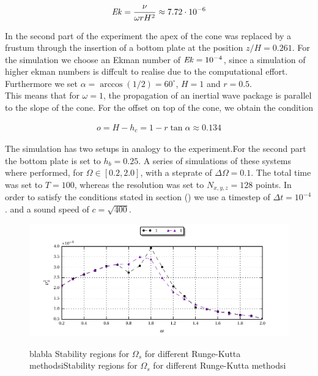 \begin{align}
    \mbox{\textit{Ek}} = \frac{\nu}{\omega r H^2} \approx 7.72\cdot 10^{-6}
\end{align}

In the second part of the experiment the apex of the cone was replaced by a frustum through the
insertion of a bottom plate at the position $z/H = 0.261$.
For the simulation we choose an Ekman number of $\mbox{\textit{Ek}} =  10^{-4}$, since a simulation of higher ekman numbers is
diffcult to realise due to the computational effort.
Furthermore we set $\alpha = \arccos(1/2) = 60^{\circ}$, $H=1$ and $r=0.5$.\\
This means that for $\omega=1$, the propagation of an inertial wave package is parallel to the slope of the cone.
For the offset on top of the cone, we obtain the condition

\begin{align}
    o = H - h_c =  1 - r\tan{\alpha} \approx 0.134
\end{align}

The simulation has two setups in analogy to the experiment.For the second part the bottom plate is set to $h_b=0.25$.
A series of simulations of these systems where performed, for $\Omega \in [0.2, 2.0]$, with a steprate of $\Delta \Omega = 0.1$.
The total time was set to $T=100$, whereas the resolution was set to $N_{x,y,z} = 128$ points.
In order to satisfy the conditions stated in section () we use a timestep of $\Delta t = 10^{-4}$.
and a sound speed of $c = \sqrt{400}$.

\clearpage

\begin{figure}[!pt]
  \centering
  \includegraphics{gfx/cone/experiment/experiment.pdf}\label{fig:cone:expseries}
  \caption{blabla
  Stability regions for $\Omega_s$ for different Runge-Kutta methodsiStability regions for $\Omega_s$ for different Runge-Kutta methodsi
  }
\end{figure}

